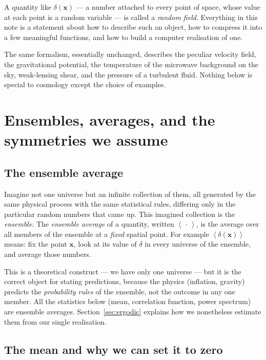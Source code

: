 \documentclass[12pt]{article}
\newcommand{\bx}{\mathbf{x}}
\newcommand{\avg}[1]{\left\langle #1 \right\rangle}
\begin{document}
A quantity like $\delta(\bx)$ --- a number attached to every point of
space, whose value at each point is a random variable --- is called a
\emph{random field}.  Everything in this note is a statement about how
to describe such an object, how to compress it into a few meaningful
functions, and how to build a computer realisation of one.

The same formalism, essentially unchanged, describes the peculiar
velocity field, the gravitational potential, the temperature of the
microwave background on the sky, weak-lensing shear, and the pressure
of a turbulent fluid.  Nothing below is special to cosmology except the
choice of examples.

\section{Ensembles, averages, and the symmetries we assume}
\label{sec:ensemble}

\subsection{The ensemble average}
\label{sec:ensemble-avg}

Imagine not one universe but an infinite collection of them, all
generated by the same physical process with the same statistical rules,
differing only in the particular random numbers that came up.  This
imagined collection is the \emph{ensemble}.  The \emph{ensemble average}
of a quantity, written $\avg{\,\cdot\,}$, is the average over all members
of the ensemble at a \emph{fixed} spatial point.  For example
$\avg{\delta(\bx)}$ means: fix the point $\bx$, look at its value of
$\delta$ in every universe of the ensemble, and average those numbers.

This is a theoretical construct --- we have only one universe --- but it
is the correct object for stating predictions, because the physics
(inflation, gravity) predicts the \emph{probability rules} of the
ensemble, not the outcome in any one member.  All the statistics below
(mean, correlation function, power spectrum) are ensemble averages.
Section~\ref{sec:ergodic} explains how we nonetheless estimate them
from our single realisation.

\subsection{The mean and why we can set it to zero}
\label{sec:mean}
\end{document}
